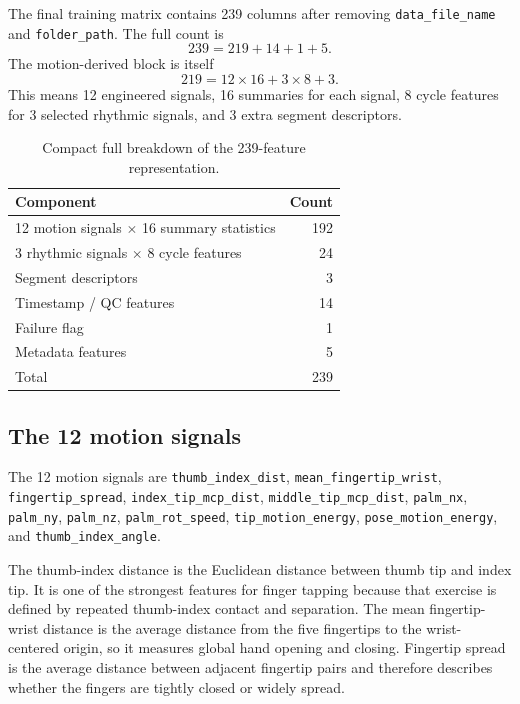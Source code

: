 \documentclass[10pt,twocolumn]{article}
\begin{document}
The final training matrix contains 239 columns after removing \texttt{data\_file\_name} and \texttt{folder\_path}. The full count is
\begin{equation}
239 = 219 + 14 + 1 + 5.
\end{equation}
The motion-derived block is itself
\begin{equation}
219 = 12 \times 16 + 3 \times 8 + 3.
\end{equation}
This means 12 engineered signals, 16 summaries for each signal, 8 cycle features for 3 selected rhythmic signals, and 3 extra segment descriptors.

\begin{table}[H]
\centering
\caption{Compact full breakdown of the 239-feature representation.}
\label{tab:slide-summary}
\begin{tabular}{p{5.4cm}r}
\toprule
Component & Count \\
\midrule
12 motion signals $\times$ 16 summary statistics & 192 \\
3 rhythmic signals $\times$ 8 cycle features & 24 \\
Segment descriptors & 3 \\
Timestamp / QC features & 14 \\
Failure flag & 1 \\
Metadata features & 5 \\
\midrule
Total & 239 \\
\bottomrule
\end{tabular}
\end{table}

\subsection{The 12 motion signals}
The 12 motion signals are \texttt{thumb\_index\_dist}, \texttt{mean\_fingertip\_wrist}, \texttt{fingertip\_spread}, \texttt{index\_tip\_mcp\_dist}, \texttt{middle\_tip\_mcp\_dist}, \texttt{palm\_nx}, \texttt{palm\_ny}, \texttt{palm\_nz}, \texttt{palm\_rot\_speed}, \texttt{tip\_motion\_energy}, \texttt{pose\_motion\_energy}, and \texttt{thumb\_index\_angle}.

The thumb-index distance is the Euclidean distance between thumb tip and index tip. It is one of the strongest features for finger tapping because that exercise is defined by repeated thumb-index contact and separation. The mean fingertip-wrist distance is the average distance from the five fingertips to the wrist-centered origin, so it measures global hand opening and closing. Fingertip spread is the average distance between adjacent fingertip pairs and therefore describes whether the fingers are tightly closed or widely spread.
\end{document}
